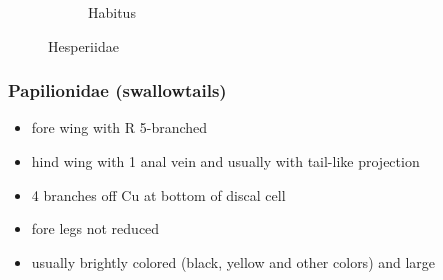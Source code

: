 \documentclass[letterpaper, 11pt]{article}
\begin{document}
\begin{figure}[ht!]
\begin{subfigure}[ht!]{0.5\textwidth}
        \caption{Habitus}
        \label{fig:hesperiid2}
    \end{subfigure}
    \caption{Hesperiidae}\label{fig:hesperiids}
\end{figure}

\subsubsection{Papilionidae (swallowtails)}
\begin{itemize}
\item fore wing with R 5-branched
\item hind wing with 1 anal vein and usually with tail-like projection
\item 4 branches off Cu at bottom of discal cell
\item fore legs not reduced
\item usually brightly colored (black, yellow and other colors) and large
\end{itemize}
\end{document}
